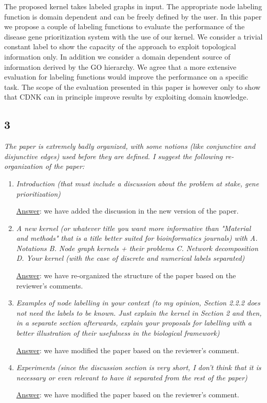 \documentclass[11pt]{article}
\begin{document}
The proposed kernel takes labeled graphs in input. The appropriate node labeling function is domain dependent and can be freely defined by the user. In this paper we propose a couple of labeling functions to evaluate the performance of the disease gene prioritization system with the use of our kernel. We consider a trivial constant label to show the capacity of the approach to exploit topological information only. In addition we consider a domain dependent source of information derived by the GO hierarchy. We agree that a more extensive evaluation for labeling functions would improve the performance on a specific task. The scope of the evaluation presented in this paper is however only to show that CDNK can in principle improve results by exploiting domain knowledge.


\subsection*{3} \textit{The paper is extremely badly organized, with some notions (like conjunctive and disjunctive edges) used before they are defined. I suggest the following re-organization of the paper:}

\begin{enumerate}
\item \textit{Introduction (that must include a discussion about the problem at stake, gene prioritization)}

\underline{Answer}: we have added the discussion in the new version of the paper.

\item \textit{A new kernel (or whatever title you want more informative than "Material and methods" that is a title better suited for bioinformatics journals) with A. Notations B. Node graph kernels + their problems C. Network decomposition D. Your kernel (with the case of discrete and numerical labels separated)}

\underline{Answer}: we have re-organized the structure of the paper based on the reviewer's comments.

\item \textit{Examples of node labelling in your context (to my opinion, Section 2.2.2 does not need the labels to be known. Just explain the kernel in Section 2 and then, in a separate section afterwards, explain your proposals for labelling with a better illustration of their usefulness in the biological framework)}

\underline{Answer}: we have modified the paper based on the reviewer's comment.

\item \textit{Experiments (since the discussion section is very short, I don't think that it is necessary or even relevant to have it separated from the rest of the paper)}

\underline{Answer}: we have modified the paper based on the reviewer's comment.

\end{enumerate}
\end{document}
